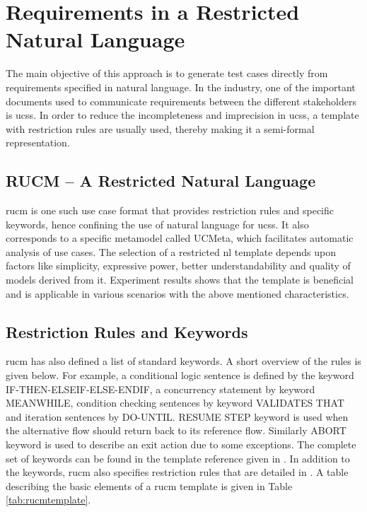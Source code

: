 \section{Requirements in a Restricted Natural Language}
The main objective of this approach is to generate test cases directly from requirements specified in natural language. In the industry, one of the important documents used to communicate requirements between the different stakeholders is \glspl{ucs}. In order to reduce the incompleteness and imprecision in \glspl{ucs}, a template with restriction rules are usually used, thereby making it a semi-formal representation. 

\subsection{RUCM – A Restricted Natural Language}
\gls{rucm} \cite{yue2013facilitating} is one such use case format that provides restriction rules and specific keywords, hence confining the use of natural language for \glspl{ucs}. It also corresponds to a specific metamodel called UCMeta, which facilitates automatic analysis of use cases. The selection of a restricted \gls{nl} template depends upon factors like simplicity, expressive power, better understandability and quality of models derived from it. Experiment results \cite{yue2013facilitating} shows that the template is beneficial and is applicable in various scenarios with the above mentioned characteristics.

\subsection{Restriction Rules and Keywords}
\gls{rucm} has also defined a list of standard keywords. A short overview of the rules is given below. For example, a conditional logic sentence is defined by the keyword IF-THEN-ELSEIF-ELSE-ENDIF, a concurrency statement by keyword MEANWHILE, condition checking sentences by keyword VALIDATES THAT and iteration sentences by DO-UNTIL. RESUME STEP keyword is used when the alternative flow should return back to its reference flow. Similarly ABORT keyword is used to describe an exit action due to some exceptions.  The complete set of keywords can be found in the template reference given in \cite{yue2013facilitating}. In addition to the keywords, \gls{rucm} also specifies restriction rules that are detailed in \cite{yue2013facilitating}. A table describing the basic elements of a \gls{rucm} template is given in Table \ref{tab:rucmtemplate}.

